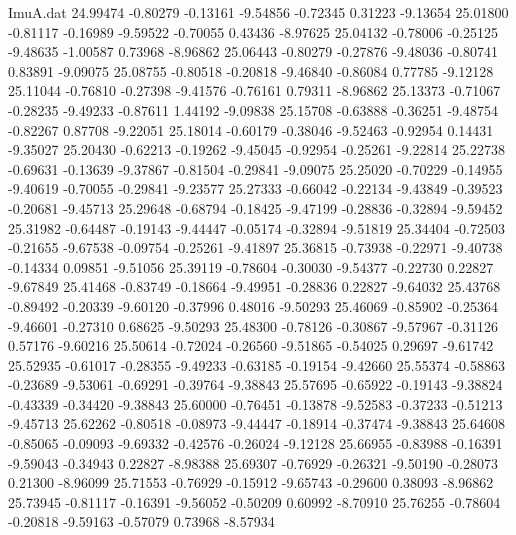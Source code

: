 \begin{filecontents}{ImuA.dat}
  24.99474   -0.80279   -0.13161   -9.54856   -0.72345    0.31223   -9.13654
  25.01800   -0.81117   -0.16989   -9.59522   -0.70055    0.43436   -8.97625
  25.04132   -0.78006   -0.25125   -9.48635   -1.00587    0.73968   -8.96862
  25.06443   -0.80279   -0.27876   -9.48036   -0.80741    0.83891   -9.09075
  25.08755   -0.80518   -0.20818   -9.46840   -0.86084    0.77785   -9.12128
  25.11044   -0.76810   -0.27398   -9.41576   -0.76161    0.79311   -8.96862
  25.13373   -0.71067   -0.28235   -9.49233   -0.87611    1.44192   -9.09838
  25.15708   -0.63888   -0.36251   -9.48754   -0.82267    0.87708   -9.22051
  25.18014   -0.60179   -0.38046   -9.52463   -0.92954    0.14431   -9.35027
  25.20430   -0.62213   -0.19262   -9.45045   -0.92954   -0.25261   -9.22814
  25.22738   -0.69631   -0.13639   -9.37867   -0.81504   -0.29841   -9.09075
  25.25020   -0.70229   -0.14955   -9.40619   -0.70055   -0.29841   -9.23577
  25.27333   -0.66042   -0.22134   -9.43849   -0.39523   -0.20681   -9.45713
  25.29648   -0.68794   -0.18425   -9.47199   -0.28836   -0.32894   -9.59452
  25.31982   -0.64487   -0.19143   -9.44447   -0.05174   -0.32894   -9.51819
  25.34404   -0.72503   -0.21655   -9.67538   -0.09754   -0.25261   -9.41897
  25.36815   -0.73938   -0.22971   -9.40738   -0.14334    0.09851   -9.51056
  25.39119   -0.78604   -0.30030   -9.54377   -0.22730    0.22827   -9.67849
  25.41468   -0.83749   -0.18664   -9.49951   -0.28836    0.22827   -9.64032
  25.43768   -0.89492   -0.20339   -9.60120   -0.37996    0.48016   -9.50293
  25.46069   -0.85902   -0.25364   -9.46601   -0.27310    0.68625   -9.50293
  25.48300   -0.78126   -0.30867   -9.57967   -0.31126    0.57176   -9.60216
  25.50614   -0.72024   -0.26560   -9.51865   -0.54025    0.29697   -9.61742
  25.52935   -0.61017   -0.28355   -9.49233   -0.63185   -0.19154   -9.42660
  25.55374   -0.58863   -0.23689   -9.53061   -0.69291   -0.39764   -9.38843
  25.57695   -0.65922   -0.19143   -9.38824   -0.43339   -0.34420   -9.38843
  25.60000   -0.76451   -0.13878   -9.52583   -0.37233   -0.51213   -9.45713
  25.62262   -0.80518   -0.08973   -9.44447   -0.18914   -0.37474   -9.38843
  25.64608   -0.85065   -0.09093   -9.69332   -0.42576   -0.26024   -9.12128
  25.66955   -0.83988   -0.16391   -9.59043   -0.34943    0.22827   -8.98388
  25.69307   -0.76929   -0.26321   -9.50190   -0.28073    0.21300   -8.96099
  25.71553   -0.76929   -0.15912   -9.65743   -0.29600    0.38093   -8.96862
  25.73945   -0.81117   -0.16391   -9.56052   -0.50209    0.60992   -8.70910
  25.76255   -0.78604   -0.20818   -9.59163   -0.57079    0.73968   -8.57934

\end{filecontents}
